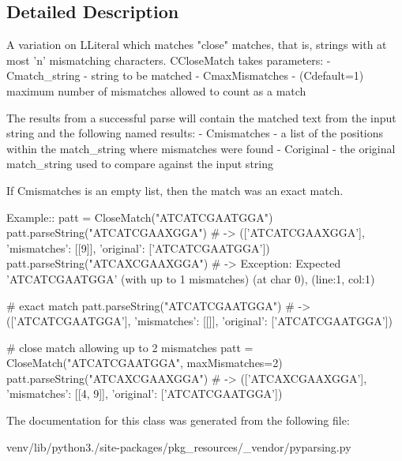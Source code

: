 \subsection{Detailed Description}
\begin{DoxyVerb}A variation on L{Literal} which matches "close" matches, that is, 
strings with at most 'n' mismatching characters. C{CloseMatch} takes parameters:
 - C{match_string} - string to be matched
 - C{maxMismatches} - (C{default=1}) maximum number of mismatches allowed to count as a match

The results from a successful parse will contain the matched text from the input string and the following named results:
 - C{mismatches} - a list of the positions within the match_string where mismatches were found
 - C{original} - the original match_string used to compare against the input string

If C{mismatches} is an empty list, then the match was an exact match.

Example::
    patt = CloseMatch("ATCATCGAATGGA")
    patt.parseString("ATCATCGAAXGGA") # -> (['ATCATCGAAXGGA'], {'mismatches': [[9]], 'original': ['ATCATCGAATGGA']})
    patt.parseString("ATCAXCGAAXGGA") # -> Exception: Expected 'ATCATCGAATGGA' (with up to 1 mismatches) (at char 0), (line:1, col:1)

    # exact match
    patt.parseString("ATCATCGAATGGA") # -> (['ATCATCGAATGGA'], {'mismatches': [[]], 'original': ['ATCATCGAATGGA']})

    # close match allowing up to 2 mismatches
    patt = CloseMatch("ATCATCGAATGGA", maxMismatches=2)
    patt.parseString("ATCAXCGAAXGGA") # -> (['ATCAXCGAAXGGA'], {'mismatches': [[4, 9]], 'original': ['ATCATCGAATGGA']})
\end{DoxyVerb}
 

The documentation for this class was generated from the following file\+:\begin{DoxyCompactItemize}
\item 
venv/lib/python3./site-\/packages/pkg\+\_\+resources/\+\_\+vendor/pyparsing.\+py\end{DoxyCompactItemize}
